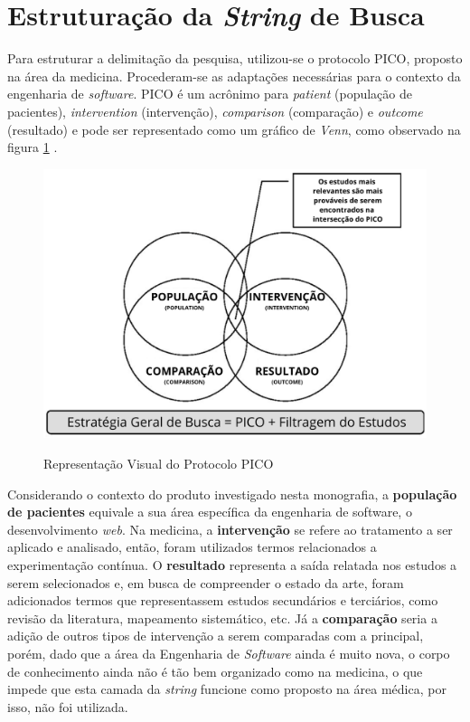\section{Estruturação da \textit{String} de Busca}

Para estruturar a delimitação da pesquisa, utilizou-se o protocolo PICO, proposto na área da medicina. Procederam-se as adaptações necessárias para o contexto da engenharia de \textit{software}. PICO é um acrônimo para \textit{patient} (população de pacientes), \textit{intervention} (intervenção), \textit{comparison} (comparação) e \textit{outcome} (resultado) e pode ser representado como um gráfico de \textit{Venn}, como observado na figura \ref{fig:pico} \cite{pai_clinical_2004}.



\begin{figure}
    \centering
    \caption{Representação Visual do Protocolo PICO }
    \includegraphics[width=0.75\linewidth]{figuras/PICO.png}
    \label{fig:pico}
\end{figure}

Considerando o contexto do produto investigado nesta monografia, a \textbf{população de pacientes} equivale a sua área específica da engenharia de software, o desenvolvimento \textit{web}. Na medicina, a \textbf{intervenção} se refere ao tratamento a ser aplicado e analisado, então, foram utilizados termos relacionados a experimentação contínua. O \textbf{resultado} representa a saída relatada nos estudos a serem selecionados e, em busca de compreender o estado da arte, foram adicionados termos que representassem estudos secundários e terciários, como revisão da literatura, mapeamento sistemático, etc. Já a \textbf{comparação} seria a adição de outros tipos de intervenção a serem comparadas com a principal, porém, dado que a área da Engenharia de \textit{Software} ainda é muito nova, o corpo de conhecimento ainda não é tão bem organizado como na medicina, o que impede que esta camada da \textit{string} funcione como proposto na área médica, por isso, não foi utilizada.

